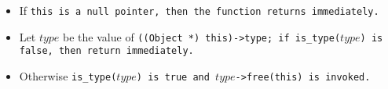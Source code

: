 \begin{itemize}[nosep]

\item If \tt{this} is a null pointer, then the function returns immediately.

\item Let $type$ be the value of \tt{((Object *) this)->type}; if
\tt{is_type(}$type$\tt{)} is \tt{false}, then return immediately.

\item Otherwise \tt{is_type(}$type$\tt{)} is
\tt{true} and $type$\tt{->free(this)} is invoked.

\end{itemize}
